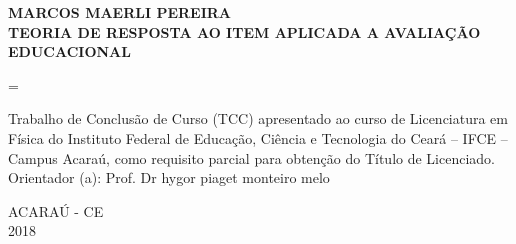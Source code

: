\begin{center}
		\textbf{MARCOS MAERLI PEREIRA}\\
		\vspace{6cm}
		\textbf{TEORIA DE RESPOSTA AO ITEM APLICADA A AVALIAÇÃO EDUCACIONAL}
		\vspace{2cm}
		\end{center}
		
            \newdimen\mylength
			\mylength = \linewidth
			\addtolength{\mylength}{-8.7cm}
						
			
			\hspace{8cm}\begin{minipage}{\mylength}
				
				Trabalho de Conclusão de Curso (TCC) apresentado ao curso de Licenciatura em Física do Instituto Federal
				de Educação, Ciência e Tecnologia do
				Ceará – IFCE – Campus Acaraú, como requisito
				parcial para obtenção do Título de Licenciado.
				\vspace*{0.7cm}
				\\Orientador (a): Prof. Dr hygor piaget monteiro melo
			\end{minipage}
			\par
			\vspace{7cm}
		\begin{center}
			ACARAÚ - CE\\
			2018
		\end{center}
		
	\newpage